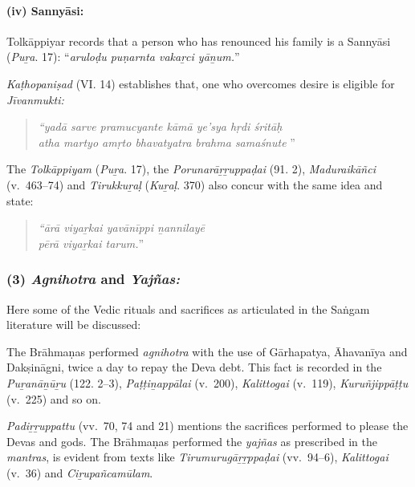 \paragraph*{(iv) Sannyāsi:}

\vskip -7pt

Tolkāppiyar records that a person who has renounced his family is a Sannyāsi (\textit{Puṟa}. 17): “\textit{aruloḍu puṇarnta vakaṟci yāṉum.}”

\textit{Kaṭhopaniṣad} (VI. 14) establishes that, one who overcomes desire is eligible for \textit{Jīvanmukti:}

\begin{quote}
\textit{“yadā sarve pramucyante kāmā ye’sya hṛdi śritāḥ}\\\textit{atha martyo amṛto bhavatyatra brahma samaśnute }”
\end{quote}

The \textit{Tolkāppiyam} (\textit{Puṟa}. 17), the \textit{Porunarāṟṟuppaḍai} (91. 2), \textit{Maduraikāñci} (v.~463–74) and \textit{Tirukkuṟaḷ} (\textit{Kuṟaḷ}. 370) also concur with the same idea and state:

\begin{quote}
\textit{“ārā viyaṟkai yavānīppi ṉannilayē}\\\textit{pērā viyaṟkai tarum.}”
\end{quote}



\subsubsection*{(3) \textit{Agnihotra} and \textit{Yajñas:}}

\vskip -7pt

Here some of the Vedic rituals and sacrifices as articulated in the Saṅgam literature will be discussed:

The Brāhmaṇas performed \textit{agnihotra} with the use of Gārhapatya, Āhavanīya and Dakṣināgni, twice a day to repay the Deva debt. This fact is recorded in the \textit{Puṟanāṉūṟu} (122. 2–3), \textit{Paṭṭiṉappālai} (v.~200), \textit{Kalittogai} (v.~119), \textit{Kuruñjippāṭṭu} (v.~225) and so on.

\textit{Padiṟṟuppattu} (vv.~70, 74 and 21) mentions the sacrifices performed to please the Devas and gods. The Brāhmaṇas performed the \textit{yajñas} as prescribed in the \textit{mantras}, is evident from texts like \textit{Tirumurugāṟṟppaḍai} (vv.~94–6), \textit{Kalittogai} (v.~36) and \textit{Ciṟupañcamūlam}.

